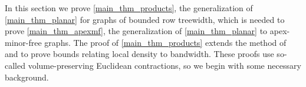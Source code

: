 \documentclass{patmorin}
\renewcommand{\ge}{\geqslant}
\DeclareMathOperator{\tw}{tw}
\begin{document}
In this section we prove \cref{main_thm_products}, the generalization of \cref{main_thm_planar} for graphs of bounded row treewidth, which is needed to prove \cref{main_thm_apexmf}, the generalization of \cref{main_thm_planar} to apex-minor-free graphs.
The proof of \cref{main_thm_products} extends the method of \citet{feige:approximating} and \citet{rao:small} to prove bounds relating local density to bandwidth. These proofs use so-called volume-preserving Euclidean contractions, so we begin with some necessary background.
\end{document}
